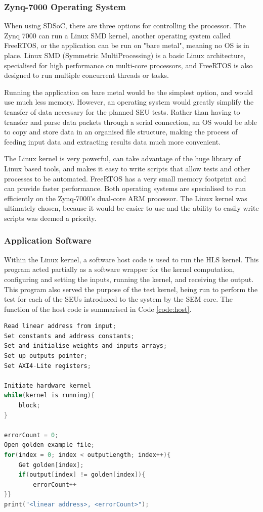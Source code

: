 \documentclass[12pt]{article}
\begin{document}
\subsubsection{Zynq-7000 Operating System}
\label{sec:Design-PS-OS}

When using SDSoC, there are three options for controlling the processor. The Zynq 7000 can run a Linux SMD kernel, another operating system called FreeRTOS, or the application can be run on "bare metal", meaning no OS is in place. Linux SMD (Symmetric MultiProcessing) is a basic Linux architecture, specialised for high performance on multi-core processors, and FreeRTOS is also designed to run multiple concurrent threads or tasks.

Running the application on bare metal would be the simplest option, and would use much less memory. However, an operating system would greatly simplify the transfer of data necessary for the planned SEU tests. Rather than having to transfer and parse data packets through a serial connection, an OS would be able to copy and store data in an organised file structure, making the process of feeding input data and extracting results data much more convenient.

The Linux kernel is very powerful, can take advantage of the huge library of Linux based tools, and makes it easy to write scripts that allow tests and other processes to be automated. FreeRTOS has a very small memory footprint and can provide faster performance. Both operating systems are specialised to run efficiently on the Zynq-7000's dual-core ARM processor. The Linux kernel was ultimately chosen, because it would be easier to use and the ability to easily write scripts was deemed a priority.

\subsubsection{Application Software}
\label{sec:Design-PS-SW}

Within the Linux kernel, a software host code is used to run the HLS kernel. This program acted partially as a software wrapper for the kernel computation, configuring  and setting the inputs, running the kernel, and receiving the output. This program also served the purpose of the test kernel, being run to perform the test for each of the SEUs introduced to the system by the SEM core. The function of the host code is summarised in Code \ref{code:host}.

\begin{lstlisting}[caption=Host code for the hardware kernel, label=code:host, language=C,deletekeywords={register}]
Read linear address from input;
Set constants and address constants;
Set and initialise weights and inputs arrays;
Set up outputs pointer;
Set AXI4-Lite registers;

Initiate hardware kernel
while(kernel is running){
	block;
}

errorCount = 0;
Open golden example file;
for(index = 0; index < outputLength; index++){
	Get golden[index];
	if(output[index] != golden[index]){
		errorCount++
}}
print("<linear address>, <errorCount>");
\end{lstlisting}
\end{document}
